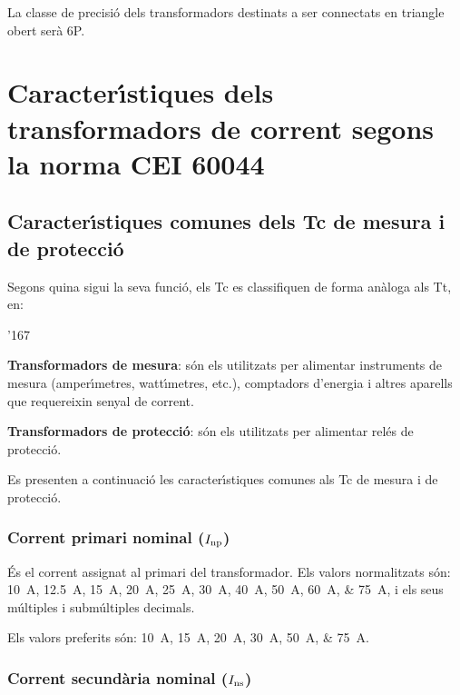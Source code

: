 La classe de precisi\'{o} dels transformadors destinats a ser connectats en triangle obert ser\`{a} 6P.

\section{Caracter\'{\i}stiques dels transformadors de corrent segons la norma  \textsf{CEI 60044}}

\subsection{Caracter\'{\i}stiques comunes dels Tc de mesura i de protecci\'{o}}

Segons quina sigui la seva funci\'{o}, els Tc es classifiquen de forma
an\`{a}loga als Tt, en:
\begin{dinglist}{'167}
   \item \textbf{Transformadors de mesura}: s\'{o}n els utilitzats per alimentar
            instruments de mesura (amper\'{\i}metres, watt\'{\i}metres, etc.),
            comptadors d'energia i altres aparells que requereixin senyal de corrent.
   \item \textbf{Transformadors de protecci\'{o}}: s\'{o}n els utilitzats per
   alimentar rel\'{e}s de protecci\'{o}.
\end{dinglist}

Es presenten a continuaci\'{o} les caracter\'{\i}stiques comunes als Tc de
mesura i de protecci\'{o}.


\subsubsection{Corrent primari nominal ($I_\mathrm{np}$)}

 \'{E}s el corrent assignat al
primari del transformador. Els valors normalitzats
s\'{o}n: \SIlist{10; 12,5; 15; 20; 25;30; 40; 50; 60;75}{A}, i els
seus m\'{u}ltiples i subm\'{u}ltiples decimals.

Els valors preferits s\'{o}n: \SIlist{10; 15; 20; 30; 50;75}{A}.


\subsubsection{Corrent secund\`{a}ria nominal ($I_\mathrm{ns}$)}

